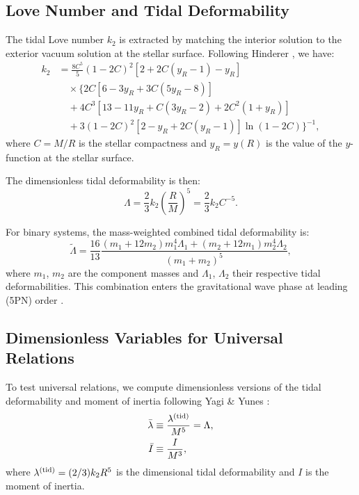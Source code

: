 \documentclass[twocolumn,showpacs,preprintnumbers,amsmath,amssymb,prd]{revtex4-2}
\begin{document}
\subsection{Love Number and Tidal Deformability}
\label{sec:methods_love}

The tidal Love number $k_2$ is extracted by matching the interior solution to the exterior vacuum solution at the stellar surface. Following Hinderer \cite{Hinderer2008}, we have:
\begin{align}
k_2 &= \frac{8C^5}{5}(1-2C)^2[2+2C(y_R-1)-y_R] \nonumber \\
&\quad \times \Big\{2C[6-3y_R+3C(5y_R-8)] \nonumber \\
&\quad + 4C^3[13-11y_R+C(3y_R-2)+2C^2(1+y_R)] \nonumber \\
&\quad + 3(1-2C)^2[2-y_R+2C(y_R-1)]\ln(1-2C)\Big\}^{-1},
\label{eq:k2_formula}
\end{align}
where $C = M/R$ is the stellar compactness and $y_R = y(R)$ is the value of the $y$-function at the stellar surface.

The dimensionless tidal deformability is then:
\begin{equation}
\Lambda = \frac{2}{3} k_2 \left(\frac{R}{M}\right)^5 = \frac{2}{3} k_2 C^{-5}.
\label{eq:Lambda_definition}
\end{equation}

For binary systems, the mass-weighted combined tidal deformability is:
\begin{equation}
\tilde{\Lambda} = \frac{16}{13} \frac{(m_1 + 12m_2)m_1^4 \Lambda_1 + (m_2 + 12m_1)m_2^4 \Lambda_2}{(m_1 + m_2)^5},
\label{eq:Lambda_tilde}
\end{equation}
where $m_1$, $m_2$ are the component masses and $\Lambda_1$, $\Lambda_2$ their respective tidal deformabilities. This combination enters the gravitational wave phase at leading (5PN) order \cite{Flanagan2008}.

\subsection{Dimensionless Variables for Universal Relations}
\label{sec:methods_dimensionless}

To test universal relations, we compute dimensionless versions of the tidal deformability and moment of inertia following Yagi \& Yunes \cite{Yagi2013}:
\begin{align}
\bar{\lambda} &\equiv \frac{\lambda^{(\rm tid)}}{M^5} = \Lambda, \label{eq:lambda_bar} \\
\bar{I} &\equiv \frac{I}{M^3}, \label{eq:I_bar}
\end{align}
where $\lambda^{(\rm tid)} = (2/3)k_2 R^5$ is the dimensional tidal deformability and $I$ is the moment of inertia.
\end{document}
